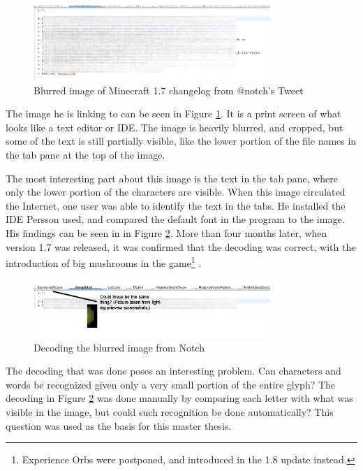 \begin{figure}[ht]
    \centering
    \includegraphics[width=0.8\textwidth]{fig/chapter1/notch_eclipse.png}
    \caption{Blurred image of Minecraft 1.7 changelog from @notch's Tweet}
    \label{fig:notch_imgur}
\end{figure}

The image he is linking to can be seen in Figure \ref{fig:notch_imgur}. It is a print screen of what looks like a text editor or IDE. The image is heavily blurred, and cropped, but some of the text is still partially visible, like the lower portion of the file names in the tab pane at the top of the image. 

The most interesting part about this image is the text in the tab pane, where only the lower portion of the characters are visible. When this image circulated the Internet, one user was able to identify the text in the tabs. He installed the IDE Persson used, and compared the default font in the program to the image. His findings can be seen in in Figure \ref{fig:notch_eclipse_decoded}. More than four months later, when version 1.7 was released, it was confirmed that the decoding was correct, with the introduction of big mushrooms in the game\footnote{Experience Orbs were postponed, and introduced in the 1.8 update instead.} \citep{misc-minecraft.172-changelog}.

\begin{figure}[ht]
    \centering
    \includegraphics[width=0.8\textwidth]{fig/chapter1/notch_eclipse_decoded.png}
    \caption{Decoding the blurred image from Notch}
    \label{fig:notch_eclipse_decoded}
\end{figure}

The decoding that was done poses an interesting problem. Can characters and words be recognized given only a very small portion of the entire glyph? The decoding in Figure \ref{fig:notch_eclipse_decoded} was done manually by comparing each letter with what was visible in the image, but could such recognition be done automatically? This question was used as the basis for this master thesis.

